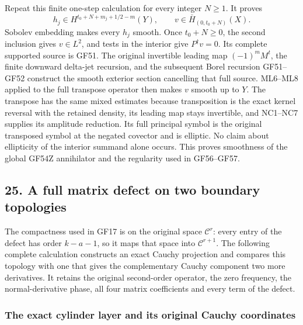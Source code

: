 \documentclass[
  11pt,
]{article}
\makeatletter
\let\ReaderOriginalAnchorStart\hyper@anchorstart
\let\ReaderOriginalAnchorEnd\hyper@anchorend
\let\ReaderPendingAliases\@empty
\def\ReaderArmAliases#1{\gdef\ReaderPendingAliases{#1}}
\def\hyper@anchorstart#1{\ReaderIfNativeAnchorTF{#1}{\ReaderPendingAliases\global\let\ReaderPendingAliases\@empty}{}\ReaderOriginalAnchorStart{#1}}
\makeatother
\begin{document}
Repeat this finite one-step calculation for every integer \(N\geq1\). It
proves \[
 h_j\in H^{t_0+N+m_j+1/2-m}(Y),
 \qquad v\in\bar H_{(0,t_0+N)}(X).
 \tag{PC9}
\] Sobolev embedding makes every \(h_j\) smooth. Once \(t_0+N\geq0\),
the second inclusion gives \(v\in L^2\), and tests in the interior give
\(P^\dagger v=0\). Its complete supported source is GF51. The original
invertible leading map \((-1)^mM^t\), the finite downward delta-jet
recursion, and the subsequent Borel recursion GF51--GF52 construct the
smooth exterior section cancelling that full source. ML6--ML8 applied to
the full transpose operator then makes \(v\) smooth up to \(Y\). The
transpose has the same mixed estimates because transposition is the
exact kernel reversal with the retained density, its leading map stays
invertible, and NC1--NC7 supplies its amplitude reduction. Its full
principal symbol is the original transposed symbol at the negated
covector and is elliptic. No claim about ellipticity of the interior
summand alone occurs. This proves smoothness of the global GF54Z
annihilator and the regularity used in GF56--GF57.

\ReaderArmAliases{\ReaderOriginalAnchorStart{graded-boundary-defect-bridge}\ReaderOriginalAnchorEnd\ReaderOriginalAnchorStart{25-a-full-matrix-defect-on-two-boundary-topologies}\ReaderOriginalAnchorEnd\begingroup\expandafter\def\csname @currentHref\endcsname{25-a-full-matrix-defect-on-two-boundary-topologies}\label{25-a-full-matrix-defect-on-two-boundary-topologies}\endgroup}
\subsection{25. A full matrix defect on two boundary
topologies}\label{graded-boundary-defect-bridge}

The compactness used in GF17 is on the original space \(\mathcal C^r\):
every entry of the defect has order \(k-a-1\), so it maps that space
into \(\mathcal C^{r+1}\). The following complete calculation constructs
an exact Cauchy projection and compares this topology with one that
gives the complementary Cauchy component two more derivatives. It
retains the original second-order operator, the zero frequency, the
normal-derivative phase, all four matrix coefficients and every term of
the defect.

\subsubsection{The exact cylinder layer and its original Cauchy
coordinates}\label{the-exact-cylinder-layer-and-its-original-cauchy-coordinates}
\end{document}

